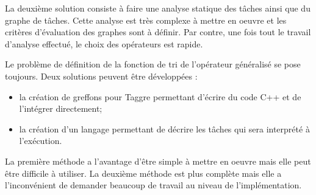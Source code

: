 La deuxième solution consiste à faire une analyse statique des tâches ainsi que du graphe de tâches.
%
Cette analyse est très complexe à mettre en oeuvre et les critères d'évaluation des graphes sont à définir.
%
Par contre, une fois tout le travail d'analyse effectué, le choix des opérateurs est rapide.


Le problème de définition de la fonction de tri de l'opérateur généralisé se pose toujours.
%
Deux solutions peuvent être développées :
\begin{itemize}
  \item la création de greffons pour Taggre permettant d'écrire du code C++ et de l'intégrer directement;
  \item la création d'un langage permettant de décrire les tâches qui sera interprété à l'exécution.
\end{itemize}
%
La première méthode a l'avantage d'être simple à mettre en oeuvre mais elle peut être difficile à utiliser.
%
La deuxième méthode est plus complète mais elle a l'inconvénient de demander beaucoup de travail au niveau de l'implémentation.


